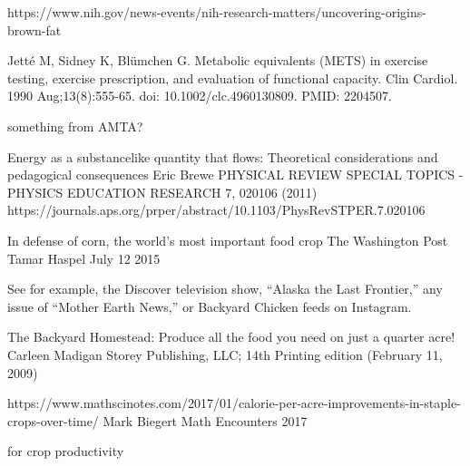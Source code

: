 \documentclass[12pt]{iopart}
\begin{document}
\begin{thebibliography}{99}
https://www.nih.gov/news-events/nih-research-matters/uncovering-origins-brown-fat

Jetté M, Sidney K, Blümchen G. Metabolic equivalents (METS) in exercise testing, exercise prescription, and evaluation of functional capacity. Clin Cardiol. 1990 Aug;13(8):555-65. doi: 10.1002/clc.4960130809. PMID: 2204507.

something from AMTA?

Energy as a substancelike quantity that flows: Theoretical considerations
and pedagogical consequences
Eric Brewe
PHYSICAL REVIEW SPECIAL TOPICS - PHYSICS EDUCATION RESEARCH 7, 020106 (2011)
https://journals.aps.org/prper/abstract/10.1103/PhysRevSTPER.7.020106

In defense of corn, the world’s most important food crop
The Washington Post
Tamar Haspel 
July 12 2015


See for example, the Discover television show, ``Alaska the Last Frontier,'' any issue of ``Mother Earth News,'' or Backyard Chicken feeds on Instagram.  

The Backyard Homestead: Produce all the food you need on just a quarter acre!
Carleen Madigan
Storey Publishing, LLC; 14th Printing edition (February 11, 2009)

https://www.mathscinotes.com/2017/01/calorie-per-acre-improvements-in-staple-crops-over-time/
Mark Biegert 
Math Encounters 
2017

 for crop productivity


\end{thebibliography}
\end{document}
